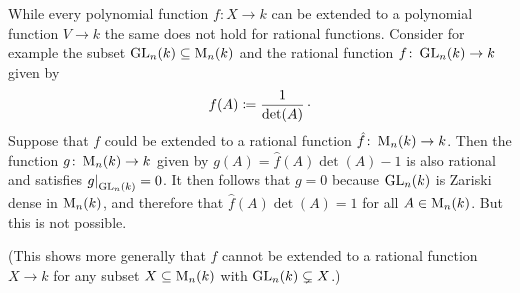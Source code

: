 \begin{warning}
  While every polynomial function $f \colon X \to k$ can be extended to a polynomial function $V \to k$ the same does not hold for rational functions.
  Consider for example the subset $\operatorname{GL}_n(k) \subseteq \operatorname{M}_n(k)$ and the rational function $f \colon \operatorname{GL}_n(k) \to k$ given by
  \[
              f(A)
    \coloneqq  \frac{1}{\det(A)} \,\cdotp
  \]
  Suppose that $f$ could be extended to a rational function $\hat{f} \colon \operatorname{M}_n(k) \to k$.
  Then the function $g \colon \operatorname{M}_n(k) \to k$ given by $g(A) = \hat{f}(A) \det(A) - 1$ is also rational and satisfies $\restrict{g}{\GL_n(k)} = 0$.
  It then follows that $g = 0$ because $\operatorname{GL}_n(k)$ is Zariski dense in $\operatorname{M}_n(k)$, and therefore that $\hat{f}(A) \det(A) = 1$ for all $A \in \operatorname{M}_n(k)$.
  But this is not possible.
  
  (This shows more generally that $f$ cannot be extended to a rational function $X \to k$ for any subset $X \subseteq \operatorname{M}_n(k)$ with $\operatorname{GL}_n(k) \subsetneq X$.)
\end{warning}


